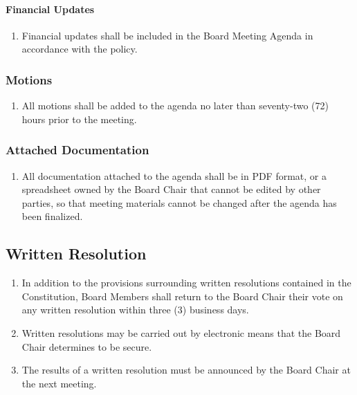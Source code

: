 \paragraph{Financial Updates}
\begin{enumerate}
 \item
  Financial updates shall be included in the Board Meeting Agenda in accordance with the  policy.
\end{enumerate}

\subsubsection{Motions}
\label{board-meeting-motions}

\begin{enumerate}
 \item
  All motions shall be added to the agenda no later than seventy-two (72) hours prior to the meeting.
\end{enumerate}

\subsubsection{Attached Documentation}
\label{attached-documentation}

\begin{enumerate}
 \item
  All documentation attached to the agenda shall be in PDF format, or a spreadsheet owned by the Board Chair that cannot be edited by other parties, so that meeting materials cannot be changed after the agenda has been finalized.
\end{enumerate}

\subsection{Written Resolution}
\label{written-resolution}

\begin{enumerate}
 \item
  In addition to the provisions surrounding written resolutions contained in the Constitution, Board Members shall return to the Board Chair their vote on any written resolution within three (3) business days.
 \item
  Written resolutions may be carried out by electronic means that the Board Chair determines to be secure.
 \item
  The results of a written resolution must be announced by the Board Chair at the next meeting.
\end{enumerate}

